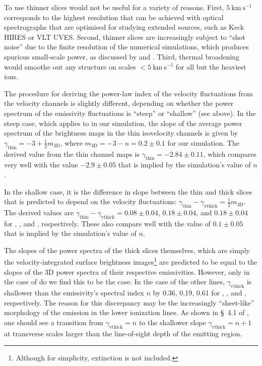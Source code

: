 \documentclass[useAMS,usenatbib]{mn2e}
\begin{document}
To use thinner slices would not be useful for a variety of reasons.
First, \(5~\mathrm{km\ s^{-1}}\) corresponds to the highest resolution 
that can be achieved with optical spectrographs
that are optimised for studying extended sources,
such as Keck HIRES or VLT UVES. 
Second, thinner slices are increasingly subject to ``shot noise'' 
due to the finite resolution of the numerical simulations,
which produces spurious small-scale power, as discussed by 
\citet {2003MNRAS.342..325E} and \citet {2003ApJ...593..831M}.
Third, thermal broadening would smoothe out any structure on 
scales \(< 5~\mathrm{km\ s^{-1}}\) for all but the heaviest ions.

The procedure for deriving the power-law index
of the velocity fluctuations from the velocity channels is
slightly different, depending on whether the power spectrum 
of the emissivity fluctuations is ``steep'' or ``shallow'' (see above). 
In the steep case, which applies to \oiii{} in our simulation, 
the slope of the average power spectrum of the brightness maps
in the thin isovelocity channels is given by 
\(\gamma_{\mathrm{thin}} = -3 + \frac12 m_{\mathrm{3D}}\),
where \(m_{\mathrm{3D}} = -3 - n = 0.2 \pm 0.1\) for our simulation.
The derived value from the \oiii{} thin channel maps is 
\(\gamma_{\mathrm{thin}} = -2.84 \pm 0.11 \),
which compares very well with the value \(-2.9 \pm 0.05\)
that is implied by the simulation's value of \(n\). 

In the shallow case, it is the difference in slope
between the thin and thick slices
that is predicted to depend on the velocity fluctuations:
\(\gamma_{\mathrm{thin}} - \gamma_{\mathrm{vthick}} = \frac12 m_{\mathrm{3D}}\). 
The derived values are 
\(\gamma_{\mathrm{thin}} - \gamma_{\mathrm{vthick}} = 0.08 \pm 0.04\), 
\(0.18 \pm 0.04\), and \(0.18 \pm 0.04\)
for \ha, \nii, and \sii, respectively. 
These also compare well with the value of \(0.1 \pm 0.05\)
that is implied by the simulation's value of \(n\). 

The slopes of the power spectra of the thick slices themselves, 
which are simply the velocity-integrated surface brightness images\footnote{
  Although for simplicity, extinction is not included.}
are predicted \citep {2000ApJ...537..720L}
to be equal to the slopes of the 3D power spectra of their respective emissivities. 
However, only in the case of \oiii{} do we find this to be the case.
In the case of the other lines, \(\gamma_{\mathrm{vthick}}\) is shallower than
the emissivity's spectral index \(n\) by 0.36, 0.19, 0.61 for \ha, \nii, and \sii, respectively. 
The reason for this discrepancy may be the increasingly ``sheet-like'' morphology
of the emission in the lower ionization lines. 
As shown in \S~4.1 of \citet {2003ApJ...593..831M}, 
one should see a transition from \(\gamma_{\mathrm{vthick}} = n\) to the 
shallower slope \(\gamma_{\mathrm{vthick}} = n + 1\) at transverse scales larger
than the line-of-sight depth of the emitting region.
\end{document}
